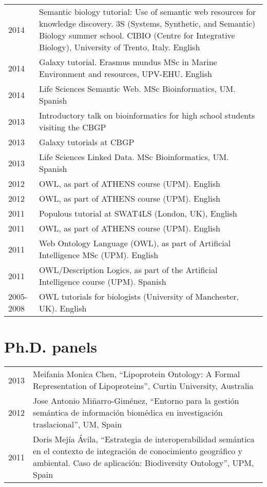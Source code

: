\documentclass[11pt,fullpage]{article}
\begin{document}
\begin{longtable}{p{0.5in}|p{5.5in}}

2014 & Semantic biology tutorial: Use of semantic web resources for knowledge discovery. 3S (Systems, Synthetic, and Semantic) Biology summer school. CIBIO (Centre for Integrative Biology), University of Trento, Italy. English \\
2014 & Galaxy tutorial. Erasmus mundus MSc in Marine Environment and resources, UPV-EHU. English \\
2014 & Life Sciences Semantic Web. MSc Bioinformatics, UM. Spanish \\ %
2013 & Introductory talk on bioinformatics for high school students visiting the CBGP \\
2013 & Galaxy tutorials at CBGP \\ %
2013 & Life Sciences Linked Data. MSc Bioinformatics, UM. Spanish \\
2012 & OWL, as part of ATHENS course (UPM). English \\
2012 & OWL, as part of ATHENS course (UPM). English \\
2011 & Populous tutorial at SWAT4LS (London, UK), English \\
2011 & OWL, as part of ATHENS course (UPM). English \\
2011 & Web Ontology Language (OWL), as part of Artificial Intelligence MSc (UPM). English \\ %
2011 & OWL/Description Logics, as part of the Artificial Intelligence course (UPM). Spanish \\ %
2005-2008 & OWL tutorials for biologists (University of Manchester, UK). English \\

\end{longtable}


\section*{Ph.D. panels}

\begin{longtable}{p{0.5in}|p{5.5in}}

2013 & Meifania Monica Chen, ``Lipoprotein Ontology: A Formal Representation of Lipoproteins'', Curtin University, Australia \\

2012 & Jose Antonio Mi\~narro-Gim\'enez, ``Entorno para la gesti\'on sem\'antica de informaci\'on biom\'edica en investigaci\'on traslacional'', UM, Spain \\

2011 & Doris Mej\'ia \'Avila, ``Estrategia de interoperabilidad sem\'antica en el contexto de integraci\'on de conocimiento geogr\'afico y ambiental. Caso de aplicaci\'on: Biodiversity Ontology'', UPM, Spain \\

\end{longtable}
\end{document}

